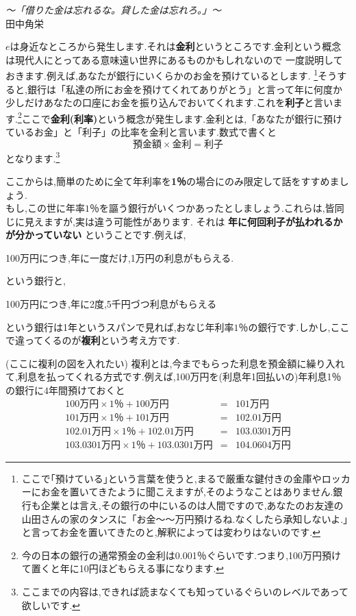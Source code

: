 \begin{flushright}
\textit {〜「借りた金は忘れるな。貸した金は忘れろ。」〜}\\
田中角栄
\end{flushright}

$e$は身近なところから発生します.それは{\bf 金利}というところです.金利という概念は現代人にとってある意味遠い世界にあるものかもしれないので
一度説明しておきます.例えば,あなたが銀行にいくらかのお金を預けているとします.
\footnote{ここで｢預けている｣という言葉を使うと,まるで厳重な鍵付きの金庫やロッカーにお金を置いてきたように聞こえますが,そのようなことはありません.銀行も企業とは言え,その銀行の中にいるのは人間ですので,あなたのお友達の山田さんの家のタンスに「お金〜〜万円預けるね.なくしたら承知しないよ.」と言ってお金を置いてきたのと,解釈によっては変わりはないのです.}そうすると,銀行は「私達の所にお金を預けてくれてありがとう」と言って年に何度か少しだけあなたの口座にお金を振り込んでおいてくれます.これを{\bf 利子}と言います.\footnote{今の日本の銀行の通常預金の金利は0.001％ぐらいです.つまり,100万円預けて置くと年に10円ほどもらえる事になります.}ここで{\bf 金利(利率)}という概念が発生します.金利とは,「あなたが銀行に預けているお金」と「利子」の比率を金利と言います.数式で書くと
\[
\mbox{預金額}\times\mbox{金利} = \mbox{利子}
\]
となります.\footnote{ここまでの内容は,できれば読まなくても知っているぐらいのレベルであって欲しいです.}\par
ここからは,簡単のために全て年利率を{\bf 1％}の場合にのみ限定して話をすすめましょう.\\
もし,この世に年率$1$％を謳う銀行がいくつかあったとしましょう.これらは,皆同じに見えますが,実は違う可能性があります.
それは {\bf 年に何回利子が払われるかが分かっていない} ということです.例えば,
\begin{center}
100万円につき,年に一度だけ,1万円の利息がもらえる.
\end{center}
という銀行と,
\begin{center}
100万円につき,年に2度,5千円づつ利息がもらえる
\end{center}
という銀行は1年というスパンで見れば,おなじ年利率$1$％の銀行です.しかし,ここで違ってくるのが{\bf 複利}という考え方です.\par
(ここに複利の図を入れたい)
複利とは,今までもらった利息を預金額に繰り入れて,利息を払ってくれる方式です.例えば,100万円を(利息年1回払いの)年利息1％の銀行に$4$年間預けておくと
\begin{eqnarray*}
100\mbox{万円} \times 1\mbox{％}  + 100\mbox{万円} &=& 101\mbox{万円}\\
101\mbox{万円} \times 1\mbox{％}  + 101\mbox{万円} &=& 102.01\mbox{万円}\\
102.01\mbox{万円} \times 1\mbox{％}  + 102.01\mbox{万円} &=& 103.0301\mbox{万円}\\
103.0301\mbox{万円} \times 1\mbox{％}  + 103.0301\mbox{万円} &=& 104.0604\mbox{万円}
\end{eqnarray*}
